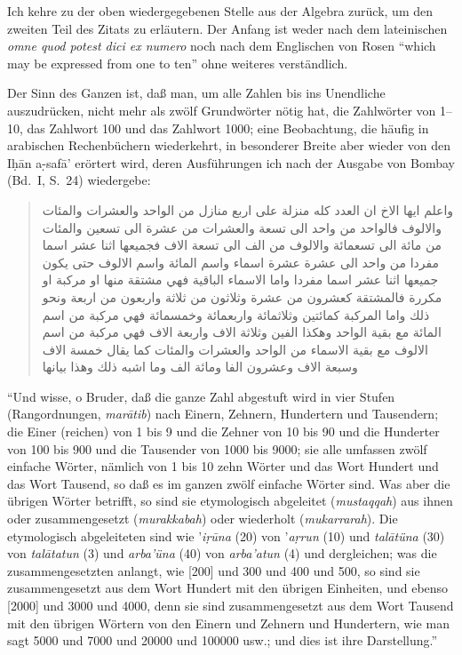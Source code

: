 \documentclass[11pt,a4paper]{article}
\newcommand{\RL}[1]{\beginR#1\endR}
\newcommand{\s}[1]{\d{#1}}     %
\newcommand{\hw}{\d{h}}       %
\newcommand{\ar}[1]{{\arabicfont\RL{#1}}}
\newcommand{\enquote}[1]{``#1''}
\begin{document}
Ich kehre zu der oben wiedergegebenen Stelle aus der Algebra zur\"uck, um den zweiten Teil des Zitats zu erl\"autern. Der Anfang ist weder nach dem lateinischen \textit{omne quod potest dici ex numero} noch nach dem Englischen von Rosen \enquote{which may be expressed from one to ten} ohne weiteres verst\"andlich.

Der Sinn des Ganzen ist, da\ss{} man, um alle Zahlen bis ins Unendliche auszudr\"ucken, nicht mehr als zw\"olf Grundw\"orter n\"otig hat, die Zahlw\"orter von 1--10, das Zahlwort 100 und das Zahlwort 1000; eine Beobachtung, die h\"aufig in arabischen Rechenb\"uchern wiederkehrt, in besonderer Breite aber wieder von den I\hw{}\=an a\s-s{}af\=a' er\"ortert wird, deren Ausf\"uhrungen ich nach der Ausgabe von Bombay (Bd.\ I, S.\ 24) wiedergebe:

\begin{quote}
\ar{واعلم ايها الاخ ان العدد كله منزلة على اربع منازل من الواحد والعشرات والمئات والالوف فالواحد من واحد الى تسعة والعشرات من عشرة الى تسعين والمئات من مائة الى تسعمائة والالوف من الف الى تسعة الاف فجميعها اثنا عشر اسما مفردا من واحد الى عشرة عشرة اسماء واسم المائة واسم الالوف حتى يكون جميعها اثنا عشر اسما مفردا واما الاسماء الباقية فهي مشتقة منها او مركبة او مكررة فالمشتقة كعشرون من عشرة وثلاثون من ثلاثة واربعون من اربعة ونحو ذلك واما المركبة كمائتين وثلاثمائة واربعمائة وخمسمائة فهي مركبة من اسم المائة مع بقية الواحد وهكذا الفين وثلاثة الاف واربعة الاف فهي مركبة من اسم الالوف مع بقية الاسماء من الواحد والعشرات والمئات كما يقال خمسة الاف وسبعة الاف وعشرون الفا ومائة الف وما اشبه ذلك وهذا بيانها}
\end{quote}

\enquote{Und wisse, o Bruder, da\ss{} die ganze Zahl abgestuft wird in vier Stufen (Rangordnungen, \textit{mar\=atib}) nach Einern, Zehnern, Hundertern und Tausendern; die Einer (reichen) von 1 bis 9 und die Zehner von 10 bis 90 und die Hunderter von 100 bis 900 und die Tausender von 1000 bis 9000; sie alle umfassen zw\"olf einfache W\"orter, n\"amlich von 1 bis 10 zehn W\"orter und das Wort Hundert und das Wort Tausend, so da\ss{} es im ganzen zw\"olf einfache W\"orter sind. Was aber die \"ubrigen W\"orter betrifft, so sind sie etymologisch abgeleitet (\textit{mustaqqah}) aus ihnen oder zusammengesetzt (\textit{murakkabah}) oder wiederholt (\textit{mukarrarah}). Die etymologisch abgeleiteten sind wie '\textit{i\s{r}\=una} (20) von '\textit{a\s{r}run} (10) und \textit{tal\=at\"una} (30) von \textit{tal\=atatun} (3) und \textit{arba'\"una} (40) von \textit{arba'atun} (4) und dergleichen; was die zusammengesetzten anlangt, wie [200] und 300 und 400 und 500, so sind sie zusammengesetzt aus dem Wort Hundert mit den \"ubrigen Einheiten, und ebenso [2000] und 3000 und 4000, denn sie sind zusammengesetzt aus dem Wort Tausend mit den \"ubrigen W\"ortern von den Einern und Zehnern und Hundertern, wie man sagt 5000 und 7000 und 20000 und 100000 usw.; und dies ist ihre Darstellung.}
\end{document}
